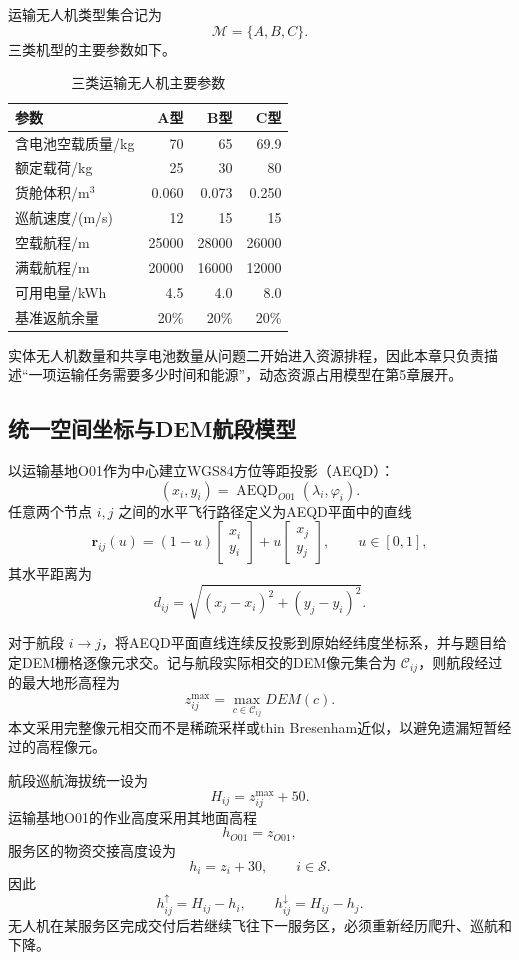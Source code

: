 \documentclass[UTF8,a4paper,12pt]{ctexart}
\begin{document}
运输无人机类型集合记为
\[
\mathcal M=\{A,B,C\}.
\]
三类机型的主要参数如下。

\begin{table}[H]
\centering
\caption{三类运输无人机主要参数}
\label{tab:common_drone}
\begin{tabular}{lrrr}
\toprule
参数 & A型 & B型 & C型\\
\midrule
含电池空载质量/kg & 70 & 65 & 69.9\\
额定载荷/kg & 25 & 30 & 80\\
货舱体积/m$^3$ & 0.060 & 0.073 & 0.250\\
巡航速度/(m/s) & 12 & 15 & 15\\
空载航程/m & 25000 & 28000 & 26000\\
满载航程/m & 20000 & 16000 & 12000\\
可用电量/kWh & 4.5 & 4.0 & 8.0\\
基准返航余量 & 20\% & 20\% & 20\%\\
\bottomrule
\end{tabular}
\end{table}

实体无人机数量和共享电池数量从问题二开始进入资源排程，因此本章只负责描述“一项运输任务需要多少时间和能源”，动态资源占用模型在第5章展开。

\subsection{统一空间坐标与DEM航段模型}

以运输基地O01作为中心建立WGS84方位等距投影（AEQD）：
\[
(x_i,y_i)=\operatorname{AEQD}_{O01}(\lambda_i,\varphi_i).
\]
任意两个节点 $i,j$ 之间的水平飞行路径定义为AEQD平面中的直线
\[
\mathbf r_{ij}(u)
=
(1-u)
\begin{bmatrix}
x_i\\y_i
\end{bmatrix}
+
u
\begin{bmatrix}
x_j\\y_j
\end{bmatrix},
\qquad u\in[0,1],
\]
其水平距离为
\[
d_{ij}
=
\sqrt{(x_j-x_i)^2+(y_j-y_i)^2}.
\]

对于航段 $i\rightarrow j$，将AEQD平面直线连续反投影到原始经纬度坐标系，并与题目给定DEM栅格逐像元求交。记与航段实际相交的DEM像元集合为 $\mathcal C_{ij}$，则航段经过的最大地形高程为
\[
z_{ij}^{\max}
=
\max_{c\in\mathcal C_{ij}}DEM(c).
\]
本文采用完整像元相交而不是稀疏采样或thin Bresenham近似，以避免遗漏短暂经过的高程像元。

航段巡航海拔统一设为
\[
H_{ij}=z_{ij}^{\max}+50.
\]
运输基地O01的作业高度采用其地面高程
\[
h_{O01}=z_{O01},
\]
服务区的物资交接高度设为
\[
h_i=z_i+30,\qquad i\in\mathcal S.
\]
因此
\[
h_{ij}^{\uparrow}=H_{ij}-h_i,\qquad
h_{ij}^{\downarrow}=H_{ij}-h_j.
\]
无人机在某服务区完成交付后若继续飞往下一服务区，必须重新经历爬升、巡航和下降。
\end{document}
